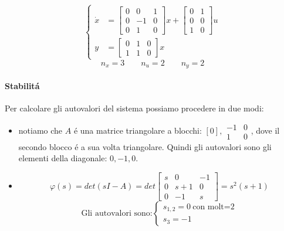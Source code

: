 
	\begin{Exercise}[title={Studio completo del sistema e stabilizzazione}, difficulty=3]
		\[
			\begin{cases}			
				\dot x &=
				\begin{bmatrix}
					0 & 0 & 1\\
					0 & -1 & 0\\
					0 & 1 & 0
				\end{bmatrix} x+
				\begin{bmatrix}
					0 & 1\\
					0 & 0\\
					1 & 0
				\end{bmatrix} u
				\\[.75cm]
				y &=
				\begin{bmatrix}
					0 & 1 & 0\\
					1 & 1 & 0
				\end{bmatrix} x
			\end{cases}
		\]
		\[ n_x = 3 \qquad n_u = 2 \qquad n_y = 2 \]
		
		\paragraph{Stabilit\'a}
			Per calcolare gli autovalori del sistema possiamo procedere in due modi:
			\begin{itemize}
				\item
					notiamo che $ A $ \'e una matrice triangolare a blocchi: $ [0] , \begin{smallmatrix} -1 & 0\\ 1 & 0 \end{smallmatrix} $, dove il secondo blocco \'e a sua volta triangolare. Quindi gli autovalori sono gli elementi della diagonale: $ 0, -1, 0 $.
				\item
					\[
						\varphi(s) = det(sI-A) = det
						\begin{bmatrix}
							s & 0 & -1\\
							0 & s+1 & 0\\
							0 & -1 & s
						\end{bmatrix} = s^2(s+1)
					\]
					\[ 
						\text{Gli autovalori sono:}
						\begin{cases}
							s_{1,2} = 0\ \text{con molt=2}\\
							s_3 = -1
						\end{cases}
					\]
			\end{itemize}
			

\end{Exercise}
